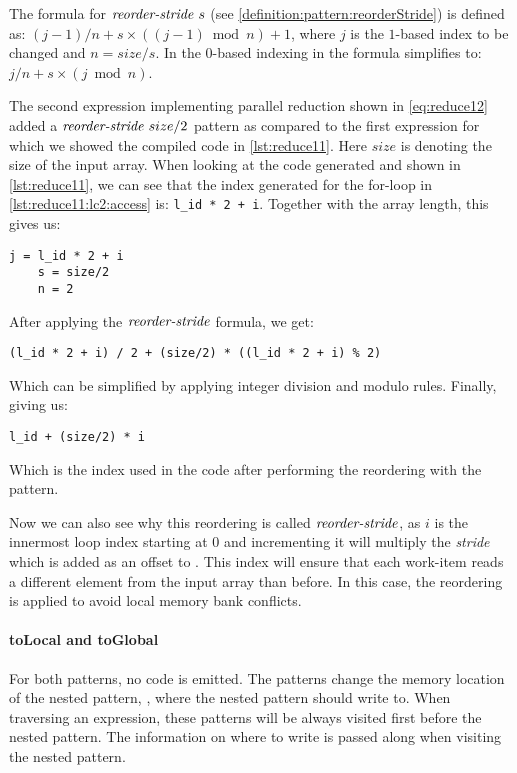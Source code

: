 The formula for $\text{\textit{reorder-stride}}\ s$ (see \autoref{definition:pattern:reorderStride}) is defined as: $(j-1) / n + s \times ((j-1) \bmod{n}) + 1$, where $j$ is the $1$-based index to be changed and $n = size / s$.
In the $0$-based indexing in \OpenCL the formula simplifies to: $j / n + s \times (j \bmod{n})$.

The second expression implementing parallel reduction shown in \autoref{eq:reduce12} added a $\text{\textit{reorder-stride}}\ size/2$ pattern as compared to the first expression for which we showed the compiled \OpenCL code in \autoref{lst:reduce11}.
Here $size$ is denoting the size of the input array.
When looking at the \OpenCL code generated and shown in \autoref{lst:reduce11}, we can see that the index generated for the for-loop in \autoref{lst:reduce11:lc2:access} is:\newline
\lstinline!l_id * 2 + i!.
Together with the array length, this gives us:
\begin{lstlisting}[numbers=none, frame=none]
    j = l_id * 2 + i
    s = size/2
    n = 2
\end{lstlisting}
After applying the $\text{\textit{reorder-stride}}$ formula, we get:
\begin{lstlisting}[numbers=none, frame=none]
    (l_id * 2 + i) / 2 + (size/2) * ((l_id * 2 + i) % 2)
\end{lstlisting}
Which can be simplified by applying integer division and modulo rules. Finally, giving us:
\begin{lstlisting}[numbers=none, frame=none]
    l_id + (size/2) * i
\end{lstlisting}
Which is the index used in the \OpenCL code after performing the reordering with the \reorderStride pattern.

Now we can also see why this reordering is called $\text{\textit{reorder-stride}}$, as $i$ is the innermost loop index starting at $0$ and incrementing it will multiply the \emph{stride} which is added as an offset to .
This index will ensure that each work-item reads a different element from the input array than before.
In this case, the reordering is applied to avoid local memory bank conflicts.

\paragraph{{\footnotesize to}Local and {\footnotesize to}Global}
For both patterns, no \OpenCL code is emitted.
The patterns change the memory location of the nested pattern, \ie, where the nested pattern should write to.
When traversing an expression, these patterns will be always visited first before the nested pattern.
The information on where to write is passed along when visiting the nested pattern.

